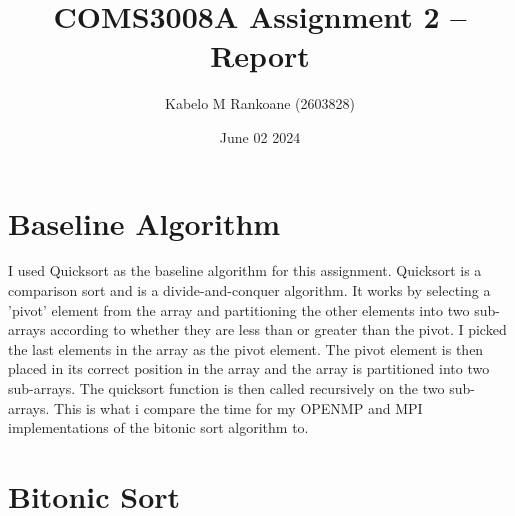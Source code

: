 

\title{COMS3008A Assignment 2 -- Report}
\author{Kabelo M Rankoane (2603828)}
\date{June 02 2024}
\maketitle
\pagestyle{fancy}
\fancyhf{}
\fancyhead[R]{\thepage}
{}
\section* {Baseline Algorithm}
I used Quicksort as the baseline algorithm for this assignment. Quicksort is a
comparison sort and is a divide-and-conquer algorithm. It works by selecting a
'pivot' element from the array and partitioning the other elements into two
sub-arrays according to whether they are less than or greater than the pivot. I
picked the last elements in the array as the pivot element. The pivot element
is then placed in its correct position in the array and the array is
partitioned into two sub-arrays. The quicksort function is then called
recursively on the two sub-arrays.
This is what i compare the time for my OPENMP and MPI implementations of the
bitonic sort algorithm to.
\section*{Bitonic Sort}


